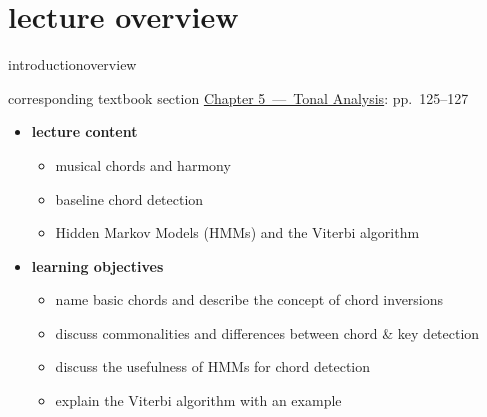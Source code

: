 




\subtitle{Module 5.8: Chord Detection}


	

    \section[overview]{lecture overview}
        \begin{frame}{introduction}{overview}
            \begin{block}{corresponding textbook section}
                    \href{http://ieeexplore.ieee.org/xpl/articleDetails.jsp?arnumber=6331122}{Chapter 5~---~Tonal Analysis}: pp.~125--127
            \end{block}

            \begin{itemize}
                \item   \textbf{lecture content}
                    \begin{itemize}
                        \item   musical chords and harmony
                        \item   baseline chord detection
                        \item   Hidden Markov Models (HMMs) and the Viterbi algorithm
                    \end{itemize}
                \bigskip
                \item<2->   \textbf{learning objectives}
                    \begin{itemize}
                        \item   name basic chords and describe the concept of chord inversions
                        \item   discuss commonalities and differences between chord \& key detection
                        \item   discuss the usefulness of HMMs for chord detection
                        \item   explain the Viterbi algorithm with an example
                    \end{itemize}
            \end{itemize}
        \end{frame}
        
